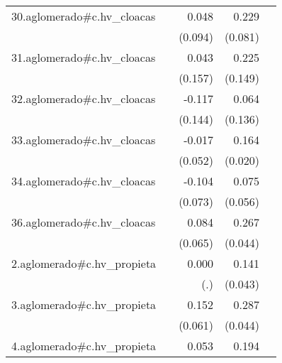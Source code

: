 {\begin{longtable}{l*{4}{D{.}{.}{-1}}}
\addlinespace
30.aglomerado#c.hv\_cloacas&                     &       0.048         &       0.229\sym{**} &                     \\
            &                     &     (0.094)         &     (0.081)         &                     \\
\addlinespace
31.aglomerado#c.hv\_cloacas&                     &       0.043         &       0.225         &                     \\
            &                     &     (0.157)         &     (0.149)         &                     \\
\addlinespace
32.aglomerado#c.hv\_cloacas&                     &      -0.117         &       0.064         &                     \\
            &                     &     (0.144)         &     (0.136)         &                     \\
\addlinespace
33.aglomerado#c.hv\_cloacas&                     &      -0.017         &       0.164\sym{***}&                     \\
            &                     &     (0.052)         &     (0.020)         &                     \\
\addlinespace
34.aglomerado#c.hv\_cloacas&                     &      -0.104         &       0.075         &                     \\
            &                     &     (0.073)         &     (0.056)         &                     \\
\addlinespace
36.aglomerado#c.hv\_cloacas&                     &       0.084         &       0.267\sym{***}&                     \\
            &                     &     (0.065)         &     (0.044)         &                     \\
\addlinespace
2.aglomerado#c.hv\_propieta&                     &       0.000         &       0.141\sym{**} &                     \\
            &                     &         (.)         &     (0.043)         &                     \\
\addlinespace
3.aglomerado#c.hv\_propieta&                     &       0.152\sym{*}  &       0.287\sym{***}&                     \\
            &                     &     (0.061)         &     (0.044)         &                     \\
\addlinespace
4.aglomerado#c.hv\_propieta&                     &       0.053         &       0.194\sym{***}&                     \\

\end{longtable}}
